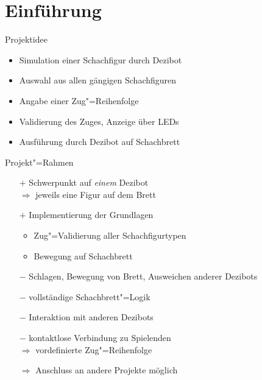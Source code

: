 
\section{Einführung}

\begin{frame}{Projektidee}
    \begin{itemize}
        \item Simulation einer Schachfigur durch Dezibot
        \item Auswahl aus allen gängigen Schachfiguren
        \item Angabe einer Zug"=Reihenfolge
        \item Validierung des Zuges, Anzeige über LEDs
        \item Ausführung durch Dezibot auf Schachbrett
    \end{itemize}
\end{frame}


\begin{frame}{Projekt"=Rahmen}
    \begin{itemize}
        \item[$+$] Schwerpunkt auf \emph{einem} Dezibot\\
            $\Rightarrow$ jeweils eine Figur auf dem Brett\\
        
        \item[$+$] Implementierung der Grundlagen\\
        \begin{itemize}
            \item Zug"=Validierung aller Schachfigurtypen
            \item Bewegung auf Schachbrett
        \end{itemize}
    \end{itemize}

    \pause
    \begin{itemize}
        \item[$-$] Schlagen, Bewegung von Brett, Ausweichen anderer Dezibots
        \item[$-$] vollständige Schachbrett"=Logik
        \item[$-$] Interaktion mit anderen Dezibots

        \item[$-$] kontaktlose Verbindung zu Spielenden\\
            $\Rightarrow$ vordefinierte Zug"=Reihenfolge

        \item[$\Rightarrow$] Anschluss an andere Projekte möglich
    \end{itemize}
\end{frame}


